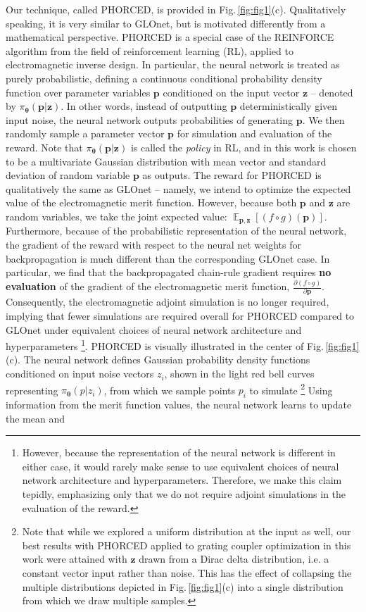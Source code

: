 \documentclass{article}
\DeclareMathOperator*{\EX}{\mathbb{E}}%
\begin{document}
Our technique, called PHORCED, is provided in Fig.\,\ref{fig:fig1}(c). Qualitatively speaking, it is very similar to GLOnet, but is motivated differently from a mathematical perspective. PHORCED is a special case of the REINFORCE algorithm \cite{williams_simple_1992, sutton_policy_2000} from the field of reinforcement learning (RL), applied to electromagnetic inverse design. In particular, the neural network is treated as purely probabilistic, defining a continuous conditional probability density function over parameter variables $\mathbf{p}$ conditioned on the input vector $\mathbf{z}$ -- denoted by $\pi_{\boldsymbol{\theta}}(\mathbf{p}|\mathbf{z})$. In other words, instead of outputting $\mathbf{p}$ deterministically given input noise, the neural network outputs probabilities of generating $\mathbf{p}$. We then randomly sample a parameter vector $\mathbf{p}$ for simulation and evaluation of the reward. Note that $\pi_{\boldsymbol{\theta}}(\mathbf{p}|\mathbf{z})$ is called the \textit{policy} in RL, and in this work is chosen to be a multivariate Gaussian distribution with mean vector and standard deviation of random variable $\mathbf{p}$ as outputs. The reward for PHORCED is qualitatively the same as GLOnet -- namely, we intend to optimize the expected value of the electromagnetic merit function. However, because both $\mathbf{p}$ and $\mathbf{z}$ are random variables, we take the joint expected value: $\EX_{\mathbf{p},\mathbf{z}}[(f\circ g)(\mathbf{p})]$.  Furthermore, because of the probabilistic representation of the neural network, the gradient of the reward with respect to the neural net weights for backpropagation is much different than the corresponding GLOnet case. In particular, we find that the backpropagated chain-rule gradient requires \textbf{no evaluation} of the gradient of the electromagnetic merit function, $\frac{\partial (f\circ g)}{\partial\mathbf{p}}$. Consequently, the electromagnetic adjoint simulation is no longer required, implying that fewer simulations are required overall for PHORCED compared to GLOnet under equivalent choices of neural network architecture and hyperparameters \footnote{However, because the representation of the neural network is different in either case, it would rarely make sense to use equivalent choices of neural network architecture and hyperparameters. Therefore, we make this claim tepidly, emphasizing only that we do not require adjoint simulations in the evaluation of the reward.}. PHORCED is visually illustrated in the center of Fig.\,\ref{fig:fig1}(c). The neural network defines Gaussian probability density functions conditioned on input noise vectors $z_i$, shown in the light red bell curves representing $\pi_\mathbf{\theta}(p|z_i)$, from which we sample points $p_i$ to simulate \footnote{Note that while we explored a uniform distribution at the input as well, our best results with PHORCED applied to grating coupler optimization in this work were attained with $\mathbf{z}$ drawn from a Dirac delta distribution, i.e. a constant vector input rather than noise. This has the effect of collapsing the multiple distributions depicted in Fig.\,\ref{fig:fig1}(c) into a single distribution from which we draw multiple samples.} Using information from the merit function values, the neural network learns to update the mean and 
\end{document}
